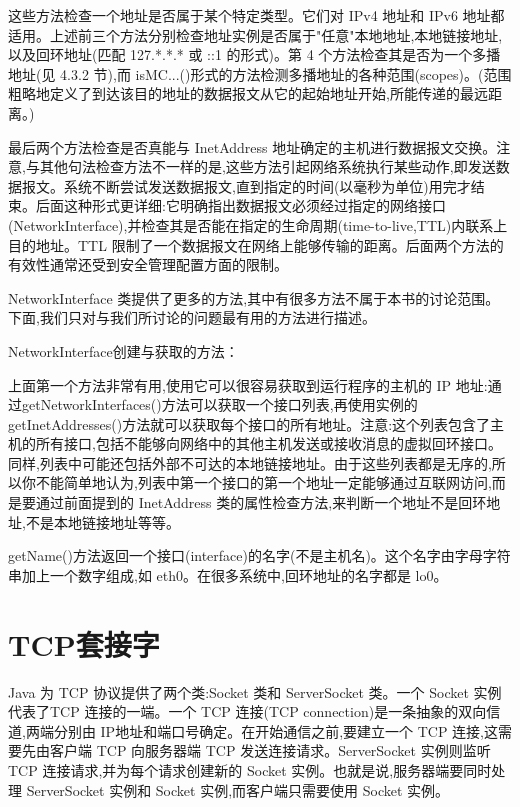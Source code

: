		

		这些方法检查一个地址是否属于某个特定类型。它们对 IPv4 地址和 IPv6 地址都适用。上述前三个方法分别检查地址实例是否属于"任意"本地地址,本地链接地址,以及回环地址(匹配 127.*.*.* 或 ::1 的形式)。第 4 个方法检查其是否为一个多播地址(见 4.3.2 节),而 isMC...()形式的方法检测多播地址的各种范围(scopes)。(范围粗略地定义了到达该目的地址的数据报文从它的起始地址开始,所能传递的最远距离。)

		最后两个方法检查是否真能与 InetAddress 地址确定的主机进行数据报文交换。注意,与其他句法检查方法不一样的是,这些方法引起网络系统执行某些动作,即发送数据报文。系统不断尝试发送数据报文,直到指定的时间(以毫秒为单位)用完才结束。后面这种形式更详细:它明确指出数据报文必须经过指定的网络接口(NetworkInterface),并检查其是否能在指定的生命周期(time-to-live,TTL)内联系上目的地址。TTL 限制了一个数据报文在网络上能够传输的距离。后面两个方法的有效性通常还受到安全管理配置方面的限制。

		NetworkInterface 类提供了更多的方法,其中有很多方法不属于本书的讨论范围。下面,我们只对与我们所讨论的问题最有用的方法进行描述。

		NetworkInterface创建与获取的方法：

		

		上面第一个方法非常有用,使用它可以很容易获取到运行程序的主机的 IP 地址:通过getNetworkInterfaces()方法可以获取一个接口列表,再使用实例的 getInetAddresses()方法就可以获取每个接口的所有地址。注意:这个列表包含了主机的所有接口,包括不能够向网络中的其他主机发送或接收消息的虚拟回环接口。同样,列表中可能还包括外部不可达的本地链接地址。由于这些列表都是无序的,所以你不能简单地认为,列表中第一个接口的第一个地址一定能够通过互联网访问,而是要通过前面提到的 InetAddress 类的属性检查方法,来判断一个地址不是回环地址,不是本地链接地址等等。

		getName()方法返回一个接口(interface)的名字(不是主机名)。这个名字由字母字符串加上一个数字组成,如 eth0。在很多系统中,回环地址的名字都是 lo0。

	\section{TCP套接字}

		Java 为 TCP 协议提供了两个类:Socket 类和 ServerSocket 类。一个 Socket 实例代表了TCP 连接的一端。一个 TCP 连接(TCP connection)是一条抽象的双向信道,两端分别由 IP地址和端口号确定。在开始通信之前,要建立一个 TCP 连接,这需要先由客户端 TCP 向服务器端 TCP 发送连接请求。ServerSocket 实例则监听 TCP 连接请求,并为每个请求创建新的 Socket 实例。也就是说,服务器端要同时处理 ServerSocket 实例和 Socket 实例,而客户端只需要使用 Socket 实例。

